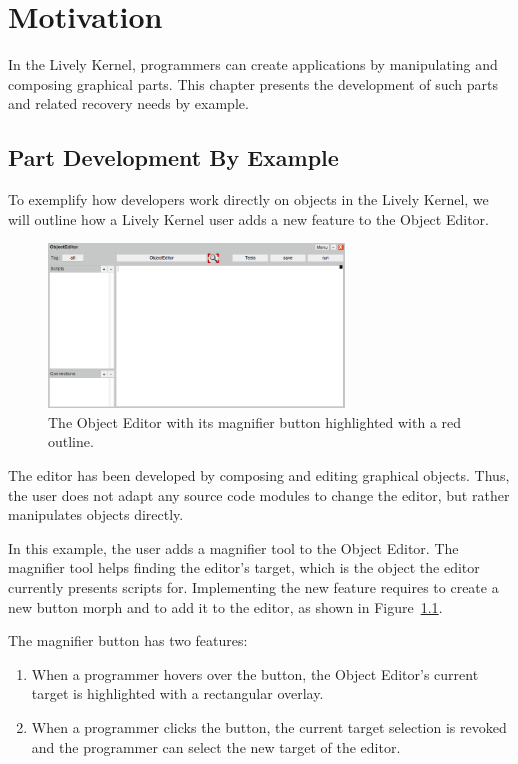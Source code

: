 \chapter{Motivation} \label{chapter:MOTIVATION}

In the Lively Kernel, programmers can create applications by manipulating and composing graphical parts.
This chapter presents the development of such parts and related recovery needs by example.


\section{Part Development By Example}

To exemplify how developers work directly on objects in the Lively Kernel, we will outline how a Lively Kernel user adds a new feature to the Object Editor.

\begin{figure}[h]
    \centering
    \includegraphics[width=0.7\textwidth]{figures/3_motivation/1_magnifierButton.png}
    \caption{The Object Editor with its magnifier button highlighted with a red outline.}
    \label{fig:MagnifierButton}
\end{figure}

The editor has been developed by composing and editing graphical objects.
Thus, the user does not adapt any source code modules to change the editor, but rather manipulates objects directly.

In this example, the user adds a magnifier tool to the Object Editor.
The magnifier tool helps finding the editor's target, which is the object the editor currently presents scripts for.
Implementing the new feature requires to create a new button morph and to add it to the editor, as shown in Figure~\ref{fig:MagnifierButton}.

The magnifier button has two features:
\begin{enumerate}
    \item When a programmer hovers over the button, the Object Editor's current target is highlighted with a rectangular overlay.
    \item When a programmer clicks the button, the current target selection is revoked and the programmer can select the new target of the editor.
\end{enumerate}

